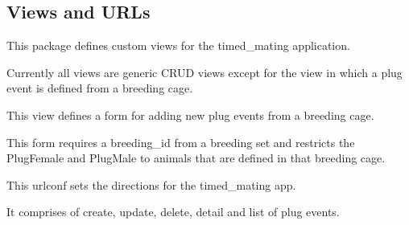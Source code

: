 \documentclass[letterpaper,10pt,english]{sphinxmanual}
\begin{document}
\subsection{Views and URLs}
\label{api:id8}\label{api:module-timed_mating.views}
This package defines custom views for the timed\_mating application.


Currently all views are generic CRUD views except for the view in which a plug event is defined from a breeding cage.


\begin{fulllineitems}
\label{api:timed_mating.views.breeding_plugevent}
This view defines a form for adding new plug events from a breeding cage.


This form requires a breeding\_id from a breeding set and restricts the PlugFemale and PlugMale to animals that are defined in that breeding cage.


\end{fulllineitems}

\label{api:module-timed_mating.urls}
This urlconf sets the directions for the timed\_mating app.


It comprises of create, update, delete, detail and list of plug events.


\begin{fulllineitems}
\label{api:timed_mating.urls.change_plugevents}
\end{fulllineitems}


\begin{fulllineitems}
\label{api:timed_mating.urls.create_plugevents}
\end{fulllineitems}

\end{document}
